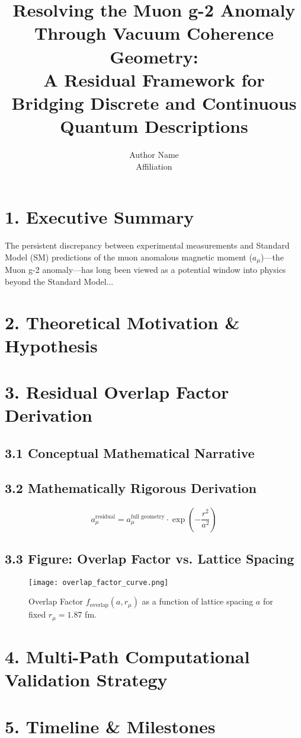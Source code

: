 \documentclass[12pt]{article}
\title{Resolving the Muon g-2 Anomaly Through Vacuum Coherence Geometry:\\ A Residual Framework for Bridging Discrete and Continuous Quantum Descriptions}
\author{Author Name \\ Affiliation}
\date{}
\begin{document}
\maketitle

\section*{1. Executive Summary}
The persistent discrepancy between experimental measurements and Standard Model (SM) predictions of the muon anomalous magnetic moment ($a_\mu$)—the Muon g-2 anomaly—has long been viewed as a potential window into physics beyond the Standard Model...

\section*{2. Theoretical Motivation \& Hypothesis}

\section*{3. Residual Overlap Factor Derivation}

\subsection*{3.1 Conceptual Mathematical Narrative}

\subsection*{3.2 Mathematically Rigorous Derivation}
\[
a_\mu^{\text{residual}} = a_\mu^{\text{full geometry}} \cdot \exp\left(-\frac{r^2}{a^2} \right)
\]

\subsection*{3.3 Figure: Overlap Factor vs. Lattice Spacing}
\begin{figure}[h!]
\centering
\texttt{[image: overlap\_factor\_curve.png]}
\caption{Overlap Factor $f_{\mathrm{overlap}}(a, r_\mu)$ as a function of lattice spacing $a$ for fixed $r_\mu = 1.87$ fm.}
\end{figure}

\section*{4. Multi-Path Computational Validation Strategy}

\section*{5. Timeline \& Milestones}
\end{document}
